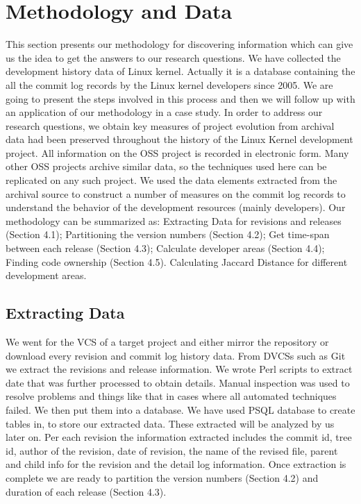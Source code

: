 \documentclass{acm_proc_article-sp}
\begin{document}
\section{Methodology and Data}
This section presents our methodology for discovering information which can give us the idea to get the answers to our research questions. We have collected the development history data of Linux kernel. Actually it is a database containing the all the commit log records by the Linux kernel developers since 2005. We are going to present the steps involved in this process and then we will follow up with an application of our methodology in a case study. In order to address our research questions, we obtain key measures of project evolution from archival data had been preserved throughout the history of the Linux Kernel development project. All information on the OSS project is recorded in electronic form. Many other OSS projects archive similar data, so the techniques used here can be replicated on any such project. We used the data elements extracted from the archival source to construct a number of measures on the commit log records to understand the behavior of the development resources (mainly developers).
Our methodology can be summarized as: Extracting Data for revisions and releases (Section 4.1); Partitioning the version numbers (Section 4.2); Get time-span between each release (Section 4.3); Calculate developer areas (Section 4.4); Finding code ownership (Section 4.5). Calculating Jaccard Distance for different development areas.

\subsection{Extracting Data}
We went for the VCS of a target project and either mirror the repository or download every revision and commit log history data. From DVCSs such as Git we extract the revisions and release information. We wrote Perl scripts to extract date that was further processed to obtain details. Manual inspection was used to resolve problems and things like that in cases where all automated techniques failed.
We then put them into a database. We have used PSQL database to create tables in, to store our extracted data. These extracted will be analyzed by us later on. Per each revision the information extracted includes the commit id, tree id, author of the revision, date of revision, the name of the revised file, parent and child info for the revision and the detail log information. Once extraction is complete we are ready to partition the version numbers (Section 4.2) and duration  of each release (Section 4.3).
\end{document}
